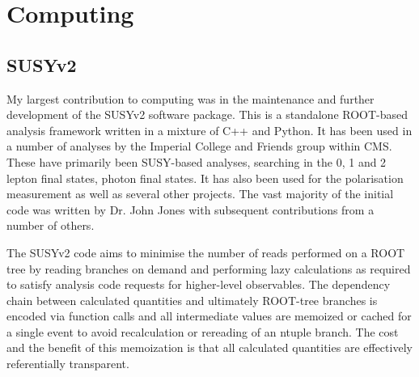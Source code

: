 \chapter{Computing}
\section{SUSYv2}
My largest contribution to computing was in the maintenance and further
development of the \ac{SUSYv2} software package. This is a standalone
\ac{ROOT}-based analysis framework written in a mixture of C++ and Python. It
has been used in a number of analyses by the Imperial College and Friends group
within \ac{CMS}. These have primarily been \ac{SUSY}-based analyses, searching
in the 0, 1 and 2 lepton final states, photon final states. It has also been
used for the \PW polarisation measurement as well as several other projects. The
vast majority of the initial code was written by Dr. John Jones with subsequent
contributions from a number of others.

The \ac{SUSYv2} code aims to minimise the number of reads performed on a
\ac{ROOT} tree by reading branches on demand and performing lazy calculations as
required to satisfy analysis code requests for higher-level observables. The
dependency chain between calculated quantities and ultimately \ac{ROOT}-tree
branches is encoded via function calls and all intermediate values are memoized
or cached for a single event to avoid recalculation or rereading of an ntuple
branch. The cost and the benefit of this memoization is that all calculated
quantities are effectively referentially transparent.
